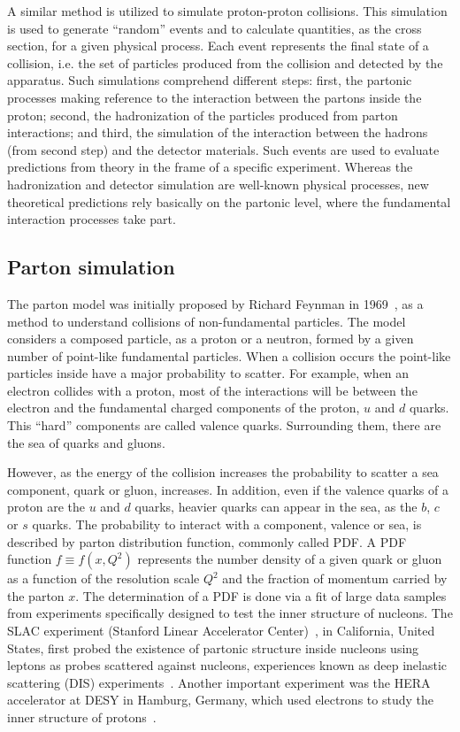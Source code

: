 A similar method is utilized to simulate proton-proton collisions. This simulation is used to generate ``random'' events and to calculate quantities, as the cross section, for a given physical process. Each event represents the final state of a collision, i.e. the set of particles produced from the collision and detected by the apparatus. Such simulations comprehend different steps: first, the partonic processes making reference to the interaction between the partons inside the proton; second, the hadronization of the particles produced from parton interactions; and third, the simulation of the interaction between the hadrons (from second step) and the detector materials. Such events are used to evaluate predictions from theory in the frame of a specific experiment. Whereas the hadronization and detector simulation are well-known physical processes, new theoretical predictions rely basically on the partonic level, where the fundamental interaction processes take part.

\subsection{Parton simulation}
\label{sec:parton}

The parton model was initially proposed by Richard Feynman in 1969~\cite{Feynman:1969ej}, as a method to understand collisions of non-fundamental particles. The model considers a composed particle, as a proton or a neutron, formed by a given number of point-like fundamental particles. When a collision occurs the point-like particles inside have a major probability to scatter. For example, when an electron collides with a proton, most of the interactions will be between the electron and the fundamental charged components of the proton, $u$ and $d$ quarks. This ``hard'' components are called valence quarks. Surrounding them, there are the sea of quarks and gluons.

However, as the energy of the collision increases the probability to scatter a sea component, quark or gluon, increases. In addition, even if the valence quarks of a proton are the $u$ and $d$ quarks, heavier quarks can appear in the sea, as the $b$, $c$ or $s$ quarks. The probability to interact with a component, valence or sea, is described by parton distribution function, commonly called PDF. A PDF function $f\equiv f(x,Q^{2})$ represents the number density of a given quark or gluon as a function of the resolution scale $Q^{2}$ and the fraction of momentum carried by the parton $x$. The determination of a PDF is done via a fit of large data samples from experiments specifically designed to test the inner structure of nucleons. The SLAC experiment (Stanford Linear Accelerator Center)~\cite{SLACTDR}, in California, United States, first probed the existence of partonic structure inside nucleons using leptons as probes scattered against nucleons, experiences known as deep inelastic scattering (DIS) experiments~\cite{Whitlow:227258}. Another important experiment was the HERA~\cite{DESY-HERA-81-10} accelerator at DESY in Hamburg, Germany, which used electrons to study the inner structure of protons~\cite{Chekanov:2009na}.

